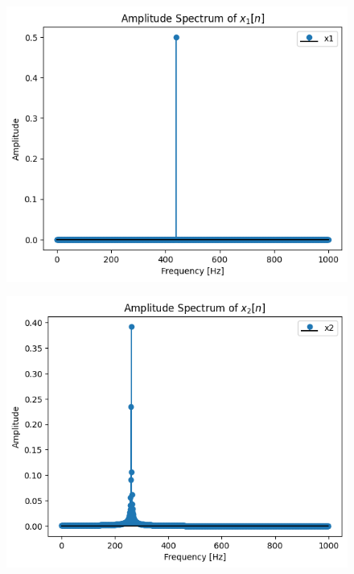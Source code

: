 \documentclass[fleqn, a4paper. 12pt]{jsarticle}
\begin{document}
  \begin{figure}[h]
    \begin{center}
    \begin{minipage}[t]{0.48\columnwidth}
        \includegraphics[width=\columnwidth]{fig_23.png}
        \label{fig:fig3}
    \end{minipage}
    \begin{minipage}[t]{0.48\columnwidth}
      \includegraphics[width=\columnwidth]{fig_24.png}
      \label{fig:fig4}
    \end{minipage}

\end{center}
\end{figure}
\end{document}
